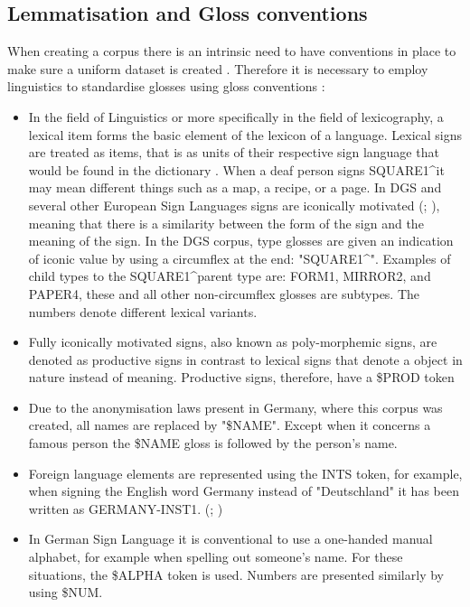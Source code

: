 \subsection{Lemmatisation and Gloss conventions}

When creating a corpus there is an intrinsic need to have conventions in place to make sure a uniform dataset is created \cite{konradoffentliches}. Therefore it is necessary to employ linguistics to standardise glosses using gloss conventions \cite{kristoffersen2016designing}:

\begin{itemize}
    \item In the field of Linguistics or more specifically in the field of lexicography, a lexical item forms the basic element of the lexicon of a language. Lexical signs are treated as items, that is as units of their respective sign language that would be found in the dictionary \cite{konradoffentliches}. When a deaf person signs SQUARE1\textasciicircum  it may mean different things such as a map, a recipe, or a page. In DGS \cite{perniss2007space} and several other European Sign Languages signs are iconically motivated (\citealp{pietrandrea2002iconicity}; \citealp{oomen2017iconicity}), meaning that there is a similarity between the form of the sign and the meaning of the sign. In the DGS corpus, type glosses are given an indication of iconic value by using a circumflex at the end: "SQUARE1\textasciicircum ". Examples of child types to the SQUARE1\textasciicircum parent type are: FORM1, MIRROR2, and PAPER4, these and all other non-circumflex glosses are subtypes. The numbers denote different lexical variants.
    \item Fully iconically motivated signs, also known as poly-morphemic signs, are denoted as productive signs in contrast to lexical signs that denote a object in nature instead of meaning. Productive signs, therefore, have a \$PROD token \cite{konradoffentliches}
    \item Due to the anonymisation laws present in Germany, where this corpus was created, all names are replaced by "\$NAME". Except when it concerns a famous person the \$NAME gloss is followed by the person's name. \cite{konradoffentliches}
    \item Foreign language elements are represented using the INTS token, for example, when signing the English word Germany instead of "Deutschland" it has been written as GERMANY-INST1. (\citealp{kellett2008english}; \citealp{konradoffentliches})
    \item In German Sign Language it is conventional to use a one-handed manual alphabet, for example when spelling out someone's name. For these situations, the \$ALPHA token is used. Numbers are presented similarly by using \$NUM. \cite{konradoffentliches}  
\end{itemize}

